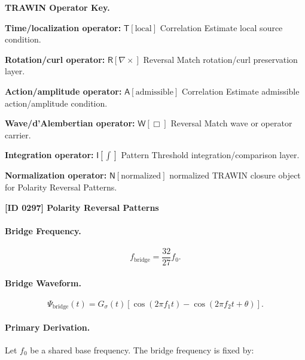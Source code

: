 \par\vspace{0.45\baselineskip}
\noindent\begin{minipage}[t]{\linewidth}
\begingroup
\small
\raggedright
\textbf{TRAWIN Operator Key.}\par
\noindent\textbf{Time/localization operator:} $\mathsf{T}\!\left[\mathrm{local}\right]$ Correlation Estimate local source condition.\par
\noindent\textbf{Rotation/curl operator:} $\mathsf{R}\!\left[\nabla\times\right]$ Reversal Match rotation/curl preservation layer.\par
\noindent\textbf{Action/amplitude operator:} $\mathsf{A}\!\left[\mathrm{admissible}\right]$ Correlation Estimate admissible action/amplitude condition.\par
\noindent\textbf{Wave/d'Alembertian operator:} $\mathsf{W}\!\left[\Box\right]$ Reversal Match wave or operator carrier.\par
\noindent\textbf{Integration operator:} $\mathsf{I}\!\left[\int\right]$ Pattern Threshold integration/comparison layer.\par
\noindent\textbf{Normalization operator:} $\mathsf{N}\!\left[\mathrm{normalized}\right]$ normalized TRAWIN closure object for Polarity Reversal Patterns.\par
\endgroup
\end{minipage}

\clearpage
\noindent\textbf{[ID 0297] Polarity Reversal Patterns}\par
\vspace{0.35em}
\paragraph{Bridge Frequency.}
\begin{equation}
f_{\mathrm{bridge}}=\frac{32}{27}f_0.
\end{equation}

\paragraph{Bridge Waveform.}
\begin{equation}
\Psi_{\mathrm{bridge}}(t)
=
G_{\sigma}(t)
\left[
\cos(2\pi f_1t)
-
\cos(2\pi f_2t+\theta)
\right].
\end{equation}

\paragraph{Primary Derivation.}
Let $f_0$ be a shared base frequency.  
The bridge frequency is fixed by:

